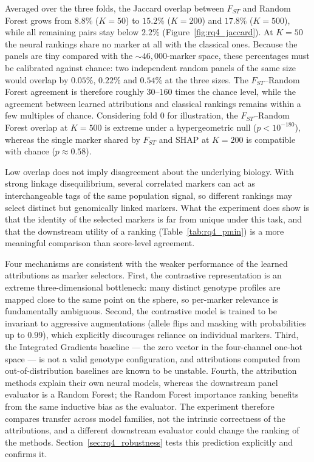 Averaged over the three folds, the Jaccard overlap between $F_{ST}$ and
Random Forest grows from $8.8\%$ ($K=50$) to $15.2\%$ ($K=200$) and
$17.8\%$ ($K=500$), while all remaining pairs stay below $2.2\%$
(Figure~\ref{fig:rq4_jaccard}). At $K=50$ the neural rankings share no
marker at all with the classical ones. Because the panels are tiny
compared with the $\sim 46{,}000$-marker space, these percentages must
be calibrated against chance: two independent random panels of the same
size would overlap by $0.05\%$, $0.22\%$ and $0.54\%$ at the three
sizes. The $F_{ST}$--Random Forest agreement is therefore roughly
$30$--$160$ times the chance level, while the agreement between learned
attributions and classical rankings remains within a few multiples of
chance. Considering fold $0$ for illustration, the $F_{ST}$--Random
Forest overlap at $K=500$ is extreme under a hypergeometric null
($p<10^{-180}$), whereas the single marker shared by $F_{ST}$ and SHAP
at $K=200$ is compatible with chance ($p\approx 0.58$).

Low overlap does not imply disagreement about the underlying
biology. With strong linkage disequilibrium, several
correlated markers can act as interchangeable tags of the same
population signal, so different rankings may select distinct but
genomically linked markers. What the experiment does show is that the
identity of the selected markers is far from unique under this task,
and that the downstream utility of a ranking
(Table~\ref{tab:rq4_pmin}) is a more meaningful comparison than
score-level agreement.

Four mechanisms are consistent with the weaker performance of the
learned attributions as marker selectors. First, the contrastive
representation is an extreme three-dimensional bottleneck: many
distinct genotype profiles are mapped close to the same point on the
sphere, so per-marker relevance is fundamentally ambiguous. Second, the
contrastive model is trained to be invariant to aggressive
augmentations (allele flips and masking with probabilities up to
$0.99$), which explicitly discourages reliance on individual markers.
Third, the Integrated Gradients baseline --- the zero vector in the
four-channel one-hot space --- is not a valid genotype configuration,
and attributions computed from out-of-distribution baselines are known
to be unstable. Fourth, the attribution methods
explain their own neural models, whereas the downstream panel evaluator
is a Random Forest; the Random Forest importance ranking benefits from
the same inductive bias as the evaluator. The experiment therefore
compares transfer across model families, not the intrinsic
correctness of the attributions, and a different downstream evaluator
could change the ranking of the methods.
Section~\ref{sec:rq4_robustness} tests this prediction explicitly and
confirms it.

